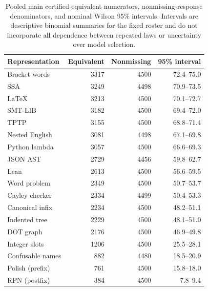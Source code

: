 \documentclass{article}
\newcommand{\pct}{\%}
\begin{document}
\begin{table}[h]
\centering
\small
\caption{Pooled main certified-equivalent numerators, nonmissing-response
denominators, and nominal Wilson 95\pct{} intervals. Intervals are descriptive
binomial summaries for the fixed roster and do not incorporate all dependence
between repeated laws or uncertainty over model selection.}
\begin{tabular}{lrrr}
\toprule
Representation & Equivalent & Nonmissing & 95\pct{} interval \\
\midrule
Bracket words & 3317 & 4500 & 72.4--75.0 \\
SSA & 3249 & 4498 & 70.9--73.5 \\
LaTeX & 3213 & 4500 & 70.1--72.7 \\
SMT-LIB & 3182 & 4500 & 69.4--72.0 \\
TPTP & 3155 & 4500 & 68.8--71.4 \\
Nested English & 3081 & 4498 & 67.1--69.8 \\
Python lambda & 3057 & 4500 & 66.6--69.3 \\
JSON AST & 2729 & 4456 & 59.8--62.7 \\
Lean & 2613 & 4500 & 56.6--59.5 \\
Word problem & 2349 & 4500 & 50.7--53.7 \\
Cayley checker & 2334 & 4499 & 50.4--53.3 \\
Canonical infix & 2234 & 4500 & 48.2--51.1 \\
Indented tree & 2229 & 4500 & 48.1--51.0 \\
DOT graph & 2176 & 4500 & 46.9--49.8 \\
Integer slots & 1206 & 4500 & 25.5--28.1 \\
Confusable names & 882 & 4480 & 18.5--20.9 \\
Polish (prefix) & 761 & 4500 & 15.8--18.0 \\
RPN (postfix) & 384 & 4500 & 7.8--9.4 \\
\bottomrule
\end{tabular}
\end{table}
\end{document}
